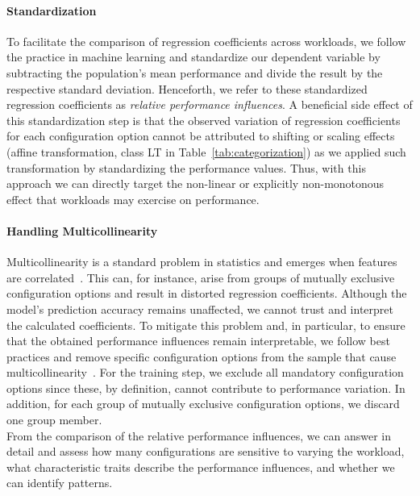 {\paragraph*{Standardization}
To facilitate the comparison of regression coefficients across workloads, we follow the practice in machine learning and standardize our dependent variable by subtracting the population’s mean performance and divide the result by the respective standard deviation. Henceforth, we refer to these standardized regression coefficients as \textit{relative performance influences}. A beneficial side effect of this standardization step is that the observed variation of regression coefficients for each configuration option cannot be attributed to shifting or scaling effects (affine transformation, class \colorbox{lt-color}{\textsf{LT}} in Table~\ref{tab:categorization}) as we applied such transformation by standardizing the performance values. Thus, with this approach we can directly target the non-linear or explicitly non-monotonous effect that workloads may exercise on performance.

\paragraph*{Handling Multicollinearity} Multicollinearity is a standard problem in statistics and emerges when features are correlated~\cite{Daoud_2017}. This can, for instance, arise from groups of mutually exclusive configuration options and result in distorted regression coefficients. Although the model's prediction accuracy remains unaffected, we cannot trust and interpret the calculated coefficients. To mitigate this problem and, in particular, to ensure that the obtained performance influences remain interpretable, we follow best practices and remove specific configuration options from the sample that cause multicollinearity~\cite{dorn2020}. For the training step, we exclude all mandatory configuration options since these, by definition, cannot contribute to performance variation. In addition, for each group of mutually exclusive configuration options, we discard one group member. \\

From the comparison of the relative performance influences, we can answer  in detail and assess how many configurations are sensitive to varying the workload, what characteristic traits describe the performance influences, and whether we can identify patterns.
}
